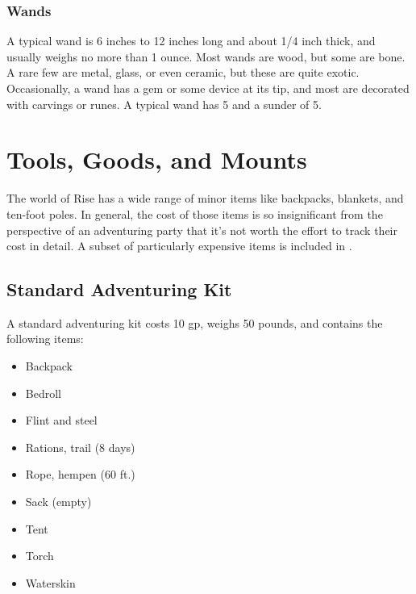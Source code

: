         \subsubsection{Wands}

             A typical wand is 6 inches to 12 inches long and about 1/4 inch thick, and usually weighs no more than 1 ounce.
            Most wands are wood, but some are bone.
            A rare few are metal, glass, or even ceramic, but these are quite exotic.
            Occasionally, a wand has a gem or some device at its tip, and most are decorated with carvings or runes.
            A typical wand has 5  and a sunder  of 5.

    

    

\newpage
\section{Tools, Goods, and Mounts}

    The world of Rise has a wide range of minor items like backpacks, blankets, and ten-foot poles.
    In general, the cost of those items is so insignificant from the perspective of an adventuring party that it's not worth the effort to track their cost in detail.
    A subset of particularly expensive items is included in .

    \subsection{Standard Adventuring Kit}
        A standard adventuring kit costs 10 gp, weighs 50 pounds, and contains the following items:
        \begin{itemize}
            \item Backpack
            \item Bedroll
            \item Flint and steel
            \item Rations, trail (8 days)
            \item Rope, hempen (60 ft.)
            \item Sack (empty)
            \item Tent
            \item Torch
            \item Waterskin
        \end{itemize}

    

    
